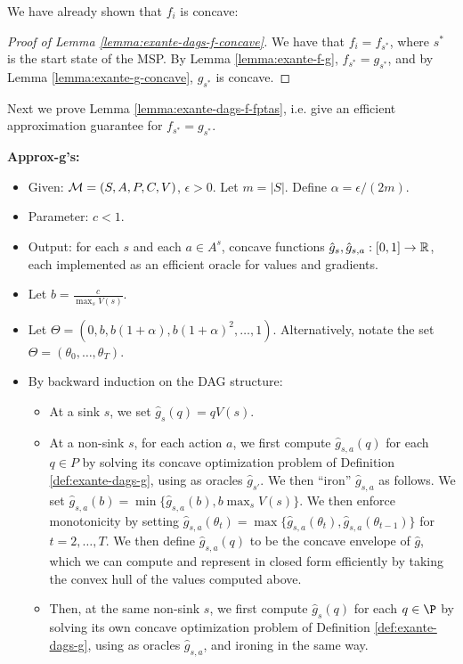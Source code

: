We have already shown that $f_i$ is concave:
\begin{proof}[Proof of Lemma \ref{lemma:exante-dags-f-concave}]
  We have that $f_i = f_{s^*}$, where $s^*$ is the start state of the MSP.
  By Lemma \ref{lemma:exante-f-g}, $f_{s^*} = g_{s^*}$, and by Lemma \ref{lemma:exante-g-concave}, $g_{s^*}$ is concave.
\end{proof}

Next we prove Lemma \ref{lemma:exante-dags-f-fptas}, i.e. give an efficient approximation guarantee for $f_{s^*} = g_{s^*}$.

\textbf{Approx-g's:}
\begin{itemize}
  \item Given: $\mathcal{M} = (S,A,P,C,V)$, $\epsilon > 0$. Let $m = |S|$. Define $\alpha = \epsilon/(2m)$.
  \item Parameter: $c < 1$.
  \item Output: for each $s$ and each $a \in A^s$, concave functions $\hat{g}_s, \hat{g}_{s,a} : [0,1] \to \mathbb{R}$, each implemented as an efficient oracle for values and gradients.
  \item Let $b = \frac{c}{\max_s V(s)}$.
  \item Let $\Theta = (0, b, b(1+\alpha), b(1+\alpha)^2, \dots, 1 )$. 
        Alternatively, notate the set $\Theta = (\theta_0,\dots,\theta_T)$.
  \item By backward induction on the DAG structure:
  \begin{itemize}
    \item At a sink $s$, we set $\hat{g}_s(q) = q V(s)$.
    \item At a non-sink $s$, for each action $a$, we first compute $\hat{g}_{s,a}(q)$ for each $q \in P$ by solving its concave optimization problem of Definition \ref{def:exante-dags-g}, using as oracles $\hat{g}_{s'}$.
          We then ``iron'' $\hat{g}_{s,a}$ as follows.
          We set $\hat{g}_{s,a}(b) = \min\{\hat{g}_{s,a}(b), b \max_s V(s)\}$.
          We then enforce monotonicity by setting $\hat{g}_{s,a}(\theta_t) = \max\{\hat{g}_{s,a}(\theta_t), \hat{g}_{s,a}(\theta_{t-1})\}$ for $t=2,\dots,T$.
          We then define $\hat{g}_{s,a}(q)$ to be the concave envelope of $\hat{g}$, which we can compute and represent in closed form efficiently by taking the convex hull of the values computed above.
    \item Then, at the same non-sink $s$, we first compute $\hat{g}_s(q)$ for each $q \in \P$ by solving its own concave optimization problem of Definition \ref{def:exante-dags-g}, using as oracles $\hat{g}_{s,a}$, and ironing in the same way.
  \end{itemize}
\end{itemize}


